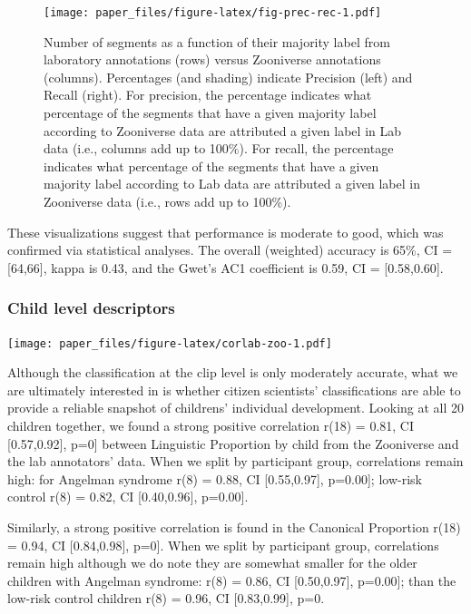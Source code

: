 \documentclass[english,,man,floatsintext]{apa6}
\begin{document}
\begin{figure}
\centering
\texttt{[image: paper\_files/figure-latex/fig-prec-rec-1.pdf]}
\caption{\label{fig:fig-prec-rec}Number of segments as a function of their majority label from laboratory annotations (rows) versus Zooniverse annotations (columns). Percentages (and shading) indicate Precision (left) and Recall (right). For precision, the percentage indicates what percentage of the segments that have a given majority label according to Zooniverse data are attributed a given label in Lab data (i.e., columns add up to 100\%). For recall, the percentage indicates what percentage of the segments that have a given majority label according to Lab data are attributed a given label in Zooniverse data (i.e., rows add up to 100\%).}
\end{figure}

These visualizations suggest that performance is moderate to good, which was confirmed via statistical analyses. The overall (weighted) accuracy is 65\%, CI = {[}64,66{]}, kappa is 0.43, and the Gwet's AC1 coefficient is 0.59, CI = {[}0.58,0.60{]}.

\hypertarget{child-level-descriptors}{%
\subsubsection{Child level descriptors}\label{child-level-descriptors}}

\texttt{[image: paper\_files/figure-latex/corlab-zoo-1.pdf]}

Although the classification at the clip level is only moderately accurate, what we are ultimately interested in is whether citizen scientists' classifications are able to provide a reliable snapshot of childrens' individual development. Looking at all 20 children together, we found a strong positive correlation r(18) = 0.81, CI {[}0.57,0.92{]}, p=0{]} between Linguistic Proportion by child from the Zooniverse and the lab annotators' data. When we split by participant group, correlations remain high: for Angelman syndrome r(8) = 0.88, CI {[}0.55,0.97{]}, p=0.00{]}; low-risk control r(8) = 0.82, CI {[}0.40,0.96{]}, p=0.00{]}.

Similarly, a strong positive correlation is found in the Canonical Proportion r(18) = 0.94, CI {[}0.84,0.98{]}, p=0{]}. When we split by participant group, correlations remain high although we do note they are somewhat smaller for the older children with Angelman syndrome: r(8) = 0.86, CI {[}0.50,0.97{]}, p=0.00{]}; than the low-risk control children r(8) = 0.96, CI {[}0.83,0.99{]}, p=0.
\end{document}
